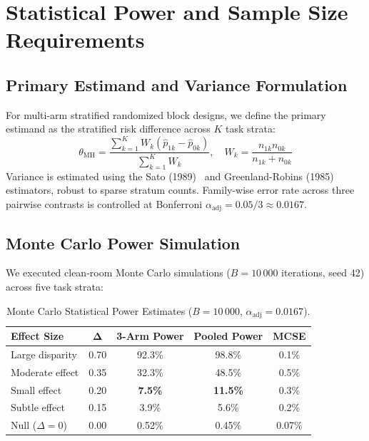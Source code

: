 \documentclass[conference]{IEEEtran}
\begin{document}
\section{Statistical Power and Sample Size Requirements}
\label{sec:stats}

\subsection{Primary Estimand and Variance Formulation}
For multi-arm stratified randomized block designs, we define the primary estimand as the stratified risk difference across $K$ task strata:
\begin{equation}
\theta_{\mathrm{MH}} = \frac{\sum_{k=1}^K W_k (\hat{p}_{1k} - \hat{p}_{0k})}{\sum_{k=1}^K W_k}, \quad W_k = \frac{n_{1k} n_{0k}}{n_{1k} + n_{0k}}
\end{equation}
Variance is estimated using the Sato (1989)~\cite{sato1989variance} and Greenland-Robins (1985)~\cite{greenland1985estimation} estimators, robust to sparse stratum counts. Family-wise error rate across three pairwise contrasts is controlled at Bonferroni $\alpha_{\mathrm{adj}} = 0.05 / 3 \approx 0.0167$.

\subsection{Monte Carlo Power Simulation}
We executed clean-room Monte Carlo simulations ($B=10\,000$ iterations, seed 42) across five task strata:

\begin{table}[t]
\centering
\footnotesize
\caption{Monte Carlo Statistical Power Estimates ($B=10\,000$, $\alpha_{\mathrm{adj}}=0.0167$).}
\label{tab:power}
\begin{tabular}{lcccc}
\toprule
\textbf{Effect Size} & $\boldsymbol{\Delta}$ & \textbf{3-Arm Power} & \textbf{Pooled Power} & \textbf{MCSE} \\
\midrule
Large disparity   & 0.70 & 92.3\% & 98.8\% & 0.1\% \\
Moderate effect   & 0.35 & 32.3\% & 48.5\% & 0.5\% \\
Small effect      & 0.20 & \textbf{7.5\%}  & \textbf{11.5\%} & 0.3\% \\
Subtle effect     & 0.15 & 3.9\%  & 5.6\%  & 0.2\% \\
Null ($\Delta=0$) & 0.00 & 0.52\% & 0.45\% & 0.07\% \\
\bottomrule
\end{tabular}
\end{table}
\end{document}
